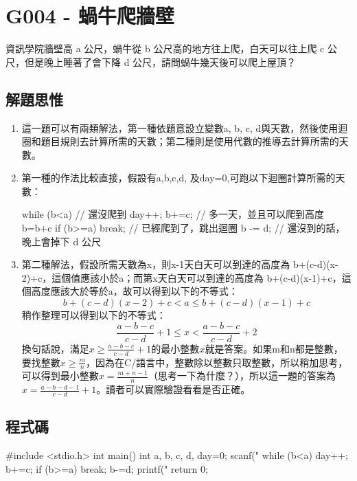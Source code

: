 \section{G004 - 蝸牛爬牆壁}
資訊學院牆壁高 a 公尺，蝸牛從 b 公尺高的地方往上爬，白天可以往上爬 c 公尺，但是晚上睡著了會下降 d 公尺，請問蝸牛幾天後可以爬上屋頂？
\subsection{解題思惟}
\begin{enumerate}
	\item 這一題可以有兩類解法，第一種依題意設立變數a, b, c, d與天數，然後使用迴圈和題目規則去計算所需的天數；第二種則是使用代數的推導去計算所需的天數。
	\item 第一種的作法比較直接，假設有a,b,c,d, 及day=0,可跑以下迴圈計算所需的天數：
	\begin{inside}
		while (b<a) { // 還沒爬到
			day++; b+=c; // 多一天，並且可以爬到高度 b=b+c
			if (b>=a) break; // 已經爬到了，跳出迴圈
			b -= d; // 還沒到的話，晚上會掉下 d 公尺
		}
	\end{inside}
	\item 第二種解法，假設所需天數為x，則x-1天白天可以到達的高度為 b+(c-d)(x-2)+c，這個值應該小於a；而第x天白天可以到達的高度為 b+(c-d)(x-1)+c，這個高度應該大於等於a，故可以得到以下的不等式：
	$$ b+(c-d)(x-2)+c < a \le b+(c-d)(x-1)+c$$
	稍作整理可以得到以下的不等式：
	$$ \frac{a-b-c}{c-d}+1 \le x < \frac{a-b-c}{c-d}+2$$
	換句話說，滿足$x\ge \frac{a-b-c}{c-d}+1$的最小整數$x$就是答案。如果m和n都是整數，要找整數$x\ge\frac{m}{n}$，因為在C/\cc{}語言中，整數除以整數只取整數，所以稍加思考，可以得到最小整數$x=\frac{m+n-1}{n}$（思考一下為什麼？），所以這一題的答案為$x=\frac{a-b-d-1}{c-d}+1$。讀者可以實際驗證看看是否正確。
\end{enumerate}
\subsection{程式碼}
\begin{cppcode}
#include <stdio.h>
int main()
{
	int a, b, c, d, day=0;
	scanf("%
	while (b<a) {
		day++; b+=c;
		if (b>=a) break;
		b-=d;
	}
	printf("%
	return 0;
}
\end{cppcode}
